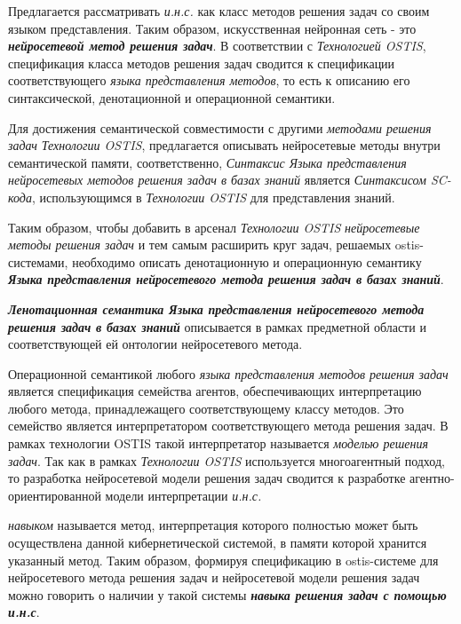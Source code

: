 Предлагается рассматривать \textit{и.н.с.} как класс методов решения задач со своим языком представления. Таким образом, искусственная нейронная сеть - это \textbf{\textit{нейросетевой метод решения задач}}. В соответствии с \textit{Технологией OSTIS}, спецификация класса методов решения задач сводится к спецификации соответствующего \textit{языка представления методов}, то есть к описанию его синтаксической, денотационной и операционной семантики.

Для достижения семантической совместимости с другими \textit{методами решения задач} \textit{Технологии OSTIS}, предлагается описывать нейросетевые методы внутри семантической памяти, соответственно, \textit{Синтаксис Языка представления \textit{нейросетевых методов решения задач в базах знаний}} является \textit{Синтаксисом SC-кода}, использующимся в \textit{Технологии OSTIS} для представления знаний.

Таким образом, чтобы добавить в арсенал \textit{Технологии OSTIS} \textit{нейросетевые методы решения задач} и тем самым расширить круг задач, решаемых ostis-системами, необходимо описать денотационную и операционную семантику \textbf{\textit{Языка представления нейросетевого метода решения задач в базах знаний}}.

\textbf{\textit{Ленотационная семантика Языка представления нейросетевого метода решения задач в базах знаний}} описывается в рамках предметной области и соответствующей ей онтологии нейросетевого метода.

Операционной семантикой любого \textit{языка представления методов решения задач} является спецификация семейства агентов, обеспечивающих интерпретацию любого метода, принадлежащего соответствующему классу методов. Это семейство является интерпретатором соответствующего метода решения задач. В рамках технологии OSTIS такой интерпретатор называется \textit{моделью решения задач}. Так как в рамках \textit{Технологии OSTIS} используется многоагентный подход, то разработка нейросетевой модели решения задач сводится к разработке агентно-ориентированной модели интерпретации \textit{и.н.с.}

\textit{навыком} называется метод, интерпретация которого полностью может быть осуществлена данной кибернетической системой, в памяти которой хранится указанный метод. Таким образом, формируя спецификацию в ostis-системе для нейросетевого метода решения задач и нейросетевой модели решения задач можно говорить о наличии у такой системы \textbf{\textit{навыка решения задач с помощью и.н.с}}.

